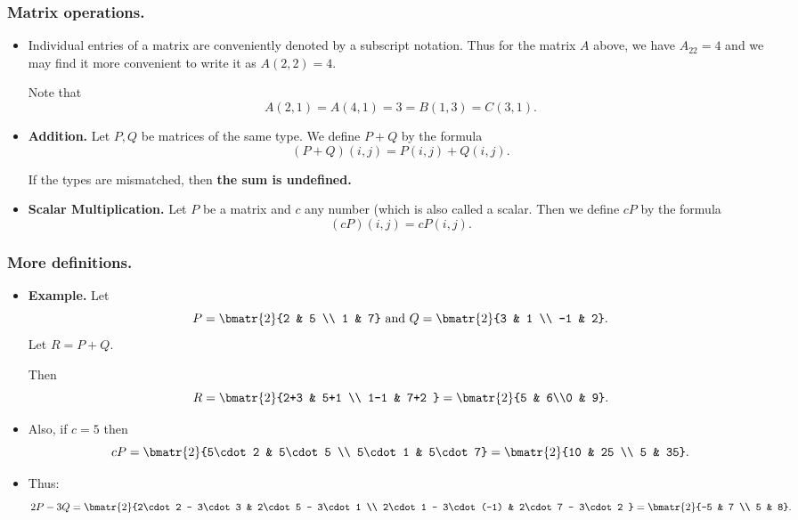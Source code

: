 
\begin{frame}%
  \frametitle{Matrix operations.}
  \begin{itemize}%

\item Individual entries of a matrix are conveniently denoted by a
subscript notation. Thus for the matrix $A$ above, we have $A_{2 2}=4$
and we may find it more convenient to  write it as $A(2,2)=4$.

Note that
$$A(2,1)=A(4,1)=3 = B(1,3) = C(3,1).$$

\item {\bf Addition.} Let $P,Q$ be matrices of the same type. We define
$P+Q$ by the formula
$$(P+Q)(i,j) = P(i,j)+Q(i,j).$$

If the types are mismatched, then {\bf the sum is undefined.}

\item {\bf Scalar Multiplication.} Let $P$ be a matrix and $c$ any
number (which is also called a scalar. 
Then we define $cP$ by the formula
$$(cP)(i,j)=cP(i,j).$$


\end{itemize}
\end{frame}


\begin{frame}%
  \frametitle{More definitions.}
  \begin{itemize}%
 
\item {\bf Example.}
Let
$$P=\bmatr{2}{2 & 5 \\ 1 & 7} \mbox{ and }
Q = \bmatr{2}{3 & 1 \\ -1 & 2}.$$
Let $R = P+Q$.

Then
$$R = \bmatr{2}{2+3 & 5+1 \\ 1-1 & 7+2 } = \bmatr{2}{5 & 6\\0 & 9}.$$ 
 

\item 
Also, if $c=5$ then
$$cP = \bmatr{2}{5\cdot 2 & 5\cdot 5 \\ 5\cdot 1 & 5\cdot 7}
= \bmatr{2}{10 & 25 \\ 5 & 35}. $$

\item Thus:
$$2P-3Q = \bmatr{2}{2\cdot  2 - 3\cdot 3 & 2\cdot 5 - 3\cdot 1 \\
                    2\cdot 1 - 3\cdot (-1) & 2\cdot 7 - 3\cdot 2 }
        =\bmatr{2}{-5 & 7 \\ 5 & 8}.$$
        
\end{itemize}

\end{frame}

